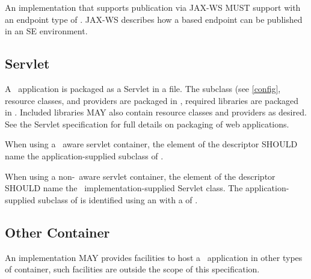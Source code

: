 An implementation that supports publication via JAX-WS MUST support  with an endpoint type of . JAX-WS describes how a  based endpoint can be published in an SE environment.

\subsection{Servlet}

A \jaxrs\ application is packaged as a Servlet in a  file. The  subclass (see \ref{config}, resource classes, and providers are packaged in , required libraries are packaged in . Included libraries MAY also contain resource classes and providers as desired. See the Servlet specification for full details on packaging of web applications.

When using a \jaxrs\ aware servlet container, the  element of the  descriptor SHOULD name the application-supplied subclass of .

When using a non-\jaxrs\ aware servlet container, the  element of the  descriptor SHOULD name the \jaxrs\ implementation-supplied Servlet class. The application-supplied subclass of  is identified using an  with a  of .

\subsection{Other Container}

An implementation MAY provides facilities to host a \jaxrs\ application in other types of container, such facilities are outside the scope of this specification.